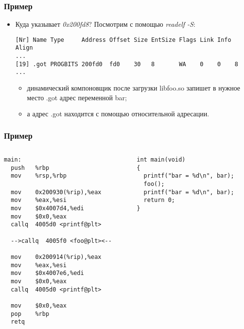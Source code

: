 \begin{frame}[fragile]
\frametitle{Пример}
\begin{itemize}
  \item Куда указывает \emph{0x200fd8}? Посмотрим с помощью \emph{readelf -S}:
  \begin{lstlisting}
[Nr] Name Type     Address Offset Size EntSize Flags Link Info Align
...
[19] .got PROGBITS 200fd0  fd0    30   8       WA    0    0    8
...
  \end{lstlisting}
  \begin{itemize}
    \item динамический компоновщик после загрузки libfoo.so запишет в нужное
    место .got адрес переменной bar;
    \item а адрес .got находится с помощью относительной адресации.
  \end{itemize}
\end{itemize}
\end{frame}

\begin{frame}[fragile]
\frametitle{Пример}
\begin{columns}
  \begin{column}{.5\linewidth}
    \begin{lstlisting}[style=base]
main:
  push   %rbp
  mov    %rsp,%rbp

  mov    0x200930(%rip),%eax
  mov    %eax,%esi
  mov    $0x4007d4,%edi
  mov    $0x0,%eax
  callq  4005d0 <printf@plt>

  -->callq  4005f0 <foo@plt><--

  mov    0x200914(%rip),%eax
  mov    %eax,%esi
  mov    $0x4007e6,%edi
  mov    $0x0,%eax
  callq  4005d0 <printf@plt>

  mov    $0x0,%eax
  pop    %rbp
  retq
    \end{lstlisting}
  \end{column}
  \begin{column}{.4\linewidth}
    \begin{lstlisting}
int main(void)
{
  printf("bar = %d\n", bar);
  foo();
  printf("bar = %d\n", bar);
  return 0;
}
    \end{lstlisting}
  \end{column}
\end{columns}
\end{frame}

